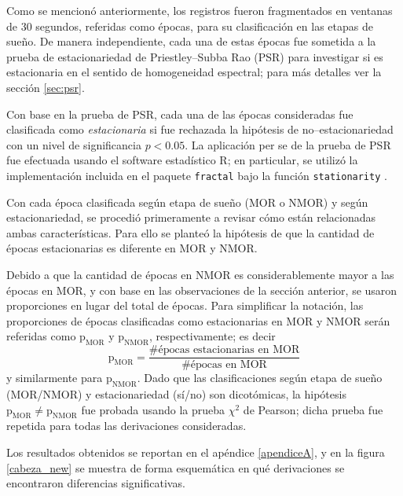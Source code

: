 \documentclass[12pt,letterpaper]{book}
\begin{document}
Como se mencionó anteriormente, los registros fueron fragmentados en ventanas de 30 segundos, referidas como épocas, para su clasificación en las etapas de sueño.
%
De manera independiente, cada una de estas épocas fue sometida a la prueba de estacionariedad de Priestley--Subba Rao (PSR) para investigar si es estacionaria en el sentido de homogeneidad espectral; para más detalles ver la sección \ref{sec:psr}.

Con base en la prueba de PSR, cada una de las épocas consideradas fue clasificada como \textit{estacionaria} 
si fue rechazada la hipótesis de no--estacionariedad con un nivel de significancia $p<0.05$.
%
La aplicación per se de la prueba de PSR fue efectuada usando el software estadístico R; en particular, se utilizó la implementación incluida en el paquete \texttt{fractal} bajo la función \texttt{stationarity} \cite{R_fractal}.

Con cada época clasificada según etapa de sueño (MOR o NMOR) y según estacionariedad, se procedió primeramente a revisar cómo están relacionadas ambas características.
%
Para ello se planteó la hipótesis de que la cantidad de épocas estacionarias es diferente en MOR y NMOR. 

Debido a que la cantidad de épocas en NMOR es considerablemente mayor a las épocas en MOR, y con base en las observaciones de la sección anterior, se usaron proporciones en lugar del total de épocas.
%
Para simplificar la notación, las proporciones de épocas clasificadas como estacionarias en MOR y NMOR serán referidas como $\text{p}_{\text{MOR}}$ y $\text{p}_{\text{NMOR}}$, respectivamente; es decir
\begin{equation}
\text{p}_{\text{MOR}} = \frac{\text{\# épocas estacionarias en MOR}}{\text{\# épocas en MOR}}
\end{equation}
y similarmente para $\text{p}_{\text{NMOR}}$.
%
Dado que las clasificaciones según etapa de sueño (MOR/NMOR) y estacionariedad (sí/no) son dicotómicas, la hipótesis $\text{p}_{\text{MOR}}\neq\text{p}_{\text{NMOR}}$ fue probada usando la prueba $\chi^{2}$ de Pearson; dicha prueba fue repetida para todas las derivaciones consideradas.

Los resultados obtenidos se reportan en el apéndice \ref{apendiceA}, y en la figura \ref{cabeza_new} se muestra de forma esquemática en qué derivaciones se encontraron diferencias significativas.
%
\end{document}
